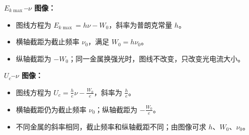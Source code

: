 \begin{casetypebox}[title={\strut\textcolor{white}{\bfseries 常见题型：光电效应图像分析}}]
\textbf{$E_{k\max}$--$\nu$ 图像：}
\begin{itemize}[leftmargin=1.5em]
  \item 图线方程为 $E_{k\max}=h\nu-W_0$，斜率为普朗克常量 $h$。
  \item 横轴截距为截止频率 $\nu_0$，满足 $W_0=h\nu_0$。
  \item 纵轴截距为 $-W_0$；同一金属换强光时，图线不改变，只改变光电流大小。
\end{itemize}

\textbf{$U_c$--$\nu$ 图像：}
\begin{itemize}[leftmargin=1.5em]
  \item 图线方程为 $U_c=\frac{h}{e}\nu-\frac{W_0}{e}$，斜率为 $\frac{h}{e}$。
  \item 横轴截距仍为截止频率 $\nu_0$；纵轴截距为 $-\frac{W_0}{e}$。
  \item 不同金属的斜率相同，截止频率和纵轴截距不同；由图像可求 $h$、$W_0$、$\nu_0$。
\end{itemize}
\end{casetypebox}